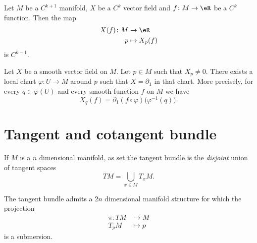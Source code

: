 \begin{proposition}         \label{PROPooGYWRooPIyocN}
	Let \( M\) be a \( C^{k+1}\) manifold, \( X\) be a \( C^k\) vector field and \( f\colon M \to \eR\) be a \( C^k\) function. Then the map
	\begin{equation}
		\begin{aligned}
			X(f)\colon M & \to \eR        \\
			p            & \mapsto X_p(f)
		\end{aligned}
	\end{equation}
	is \( C^{k-1}\).
\end{proposition}

\begin{lemma}       \label{LEMooLNIAooCmbLQp}
	Let \( X\) be a smooth vector field on \( M\). Let \( p\in M\) such that \( X_p\neq 0\). There exists a local chart \( \varphi\colon U\to M\) around \( p\) such that \( X=\partial_1\) in that chart. More precisely, for every \( q\in \varphi(U)\) and every smooth function \( f\) on \( M\) we have
	\begin{equation}
		X_q(f)=\partial_1(f\circ \varphi)\big( \varphi^{-1}(q) \big).
	\end{equation}
\end{lemma}


\section{Tangent and cotangent bundle}

If $M$ is a $n$ dimensional manifold, as set the tangent bundle is the \emph{disjoint} union of tangent spaces
\begin{equation}
	TM=\bigcup_{x\in M}T_xM.
\end{equation}

\begin{theorem}
	The tangent bundle admits a $2n$ dimensional manifold structure for which the projection
	\begin{equation}
		\begin{aligned}
			\pi \colon TM & \to M     \\
			T_pM          & \mapsto p
		\end{aligned}
	\end{equation}
	is a submersion.
\end{theorem}

